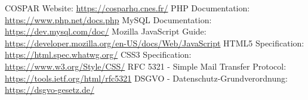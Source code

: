 \documentclass[11pt,a4paper]{article}
\begin{document}
\begin{thebibliography}{99}
 COSPAR Website: \url{https://cosparhq.cnes.fr/}
 PHP Documentation: \url{https://www.php.net/docs.php}
 MySQL Documentation: \url{https://dev.mysql.com/doc/}
 Mozilla JavaScript Guide: \url{https://developer.mozilla.org/en-US/docs/Web/JavaScript}
 HTML5 Specification: \url{https://html.spec.whatwg.org/}
 CSS3 Specification: \url{https://www.w3.org/Style/CSS/}
 RFC 5321 - Simple Mail Transfer Protocol: \url{https://tools.ietf.org/html/rfc5321}
 DSGVO - Datenschutz-Grundverordnung: \url{https://dsgvo-gesetz.de/}
\end{thebibliography}
\end{document}
